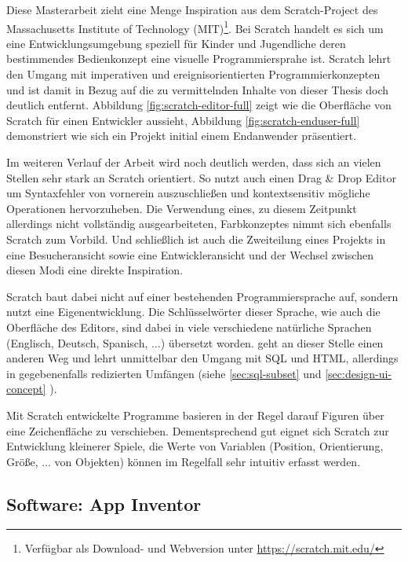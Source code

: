 Diese Masterarbeit zieht eine Menge Inspiration aus dem Scratch-Project des Massachusetts Institute of Technology (MIT)\footnote{Verfügbar als Download- und Webversion unter \url{https://scratch.mit.edu/}}. Bei Scratch handelt es sich um eine Entwicklungsumgebung speziell für Kinder und Jugendliche deren bestimmendes Bedienkonzept eine visuelle Programmiersprahe ist. Scratch lehrt den Umgang mit imperativen und ereignisorientierten Programmierkonzepten und ist damit in Bezug auf die zu vermittelnden Inhalte von dieser Thesis doch deutlich entfernt. Abbildung \ref{fig:scratch-editor-full} zeigt wie die Oberfläche von Scratch für einen Entwickler aussieht, Abbildung \ref{fig:scratch-enduser-full} demonstriert wie sich ein Projekt initial einem Endanwender präsentiert.

Im weiteren Verlauf der Arbeit wird noch deutlich werden, dass sich \idename an vielen Stellen sehr stark an Scratch orientiert. So nutzt auch \idename einen Drag \& Drop Editor um Syntaxfehler von vornerein auszuschließen und kontextsensitiv mögliche Operationen hervorzuheben. Die Verwendung eines, zu diesem Zeitpunkt allerdings nicht vollständig ausgearbeiteten, Farbkonzeptes nimmt sich ebenfalls Scratch zum Vorbild. Und schließlich ist auch die Zweiteilung eines Projekts in eine Besucheransicht sowie eine Entwickleransicht und der Wechsel zwischen diesen Modi eine direkte Inspiration.

Scratch baut dabei nicht auf einer bestehenden Programmiersprache auf, sondern nutzt eine Eigenentwicklung. Die Schlüsselwörter dieser Sprache, wie auch die Oberfläche des Editors, sind dabei in viele verschiedene natürliche Sprachen (Englisch, Deutsch, Spanisch, ...) übersetzt worden. \idename geht an dieser Stelle einen anderen Weg und lehrt unmittelbar den Umgang mit SQL und HTML, allerdings in gegebenenfalls redizierten Umfängen (siehe \ref{sec:sql-subset}  und \ref{sec:design-ui-concept} ).

Mit Scratch entwickelte Programme basieren in der Regel darauf Figuren über eine Zeichenfläche zu verschieben. Dementsprechend gut eignet sich Scratch zur Entwicklung kleinerer Spiele, die Werte von Variablen (Position, Orientierung, Größe, ... von Objekten) können im Regelfall sehr intuitiv erfasst werden.

\newpage

\subsection{Software: App Inventor}

